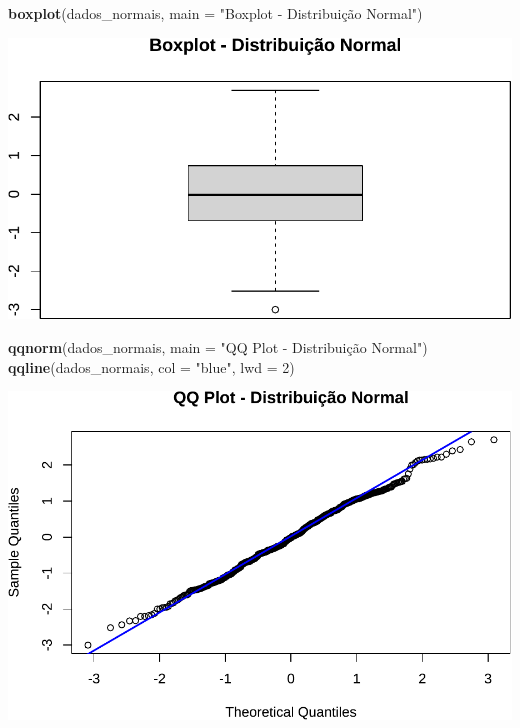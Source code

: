 \documentclass[
]{book}
\newenvironment{Shaded}{\begin{snugshade}}{\end{snugshade}}
\newcommand{\AttributeTok}[1]{\textcolor[rgb]{0.13,0.29,0.53}{#1}}
\newcommand{\DecValTok}[1]{\textcolor[rgb]{0.00,0.00,0.81}{#1}}
\newcommand{\FunctionTok}[1]{\textcolor[rgb]{0.13,0.29,0.53}{\textbf{#1}}}
\newcommand{\NormalTok}[1]{#1}
\newcommand{\StringTok}[1]{\textcolor[rgb]{0.31,0.60,0.02}{#1}}
\begin{document}
\begin{Shaded}
\begin{Highlighting}[]
\FunctionTok{boxplot}\NormalTok{(dados\_normais, }\AttributeTok{main =} \StringTok{"Boxplot {-} Distribuição Normal"}\NormalTok{)}
\end{Highlighting}
\end{Shaded}

\includegraphics{Livro-Estatistica+R_files/figure-latex/enormal-2.pdf}

\begin{Shaded}
\begin{Highlighting}[]
\FunctionTok{qqnorm}\NormalTok{(dados\_normais, }\AttributeTok{main =} \StringTok{"QQ Plot {-} Distribuição Normal"}\NormalTok{)}
\FunctionTok{qqline}\NormalTok{(dados\_normais, }\AttributeTok{col =} \StringTok{"blue"}\NormalTok{, }\AttributeTok{lwd =} \DecValTok{2}\NormalTok{)}
\end{Highlighting}
\end{Shaded}

\includegraphics{Livro-Estatistica+R_files/figure-latex/enormal-3.pdf}
\end{document}
